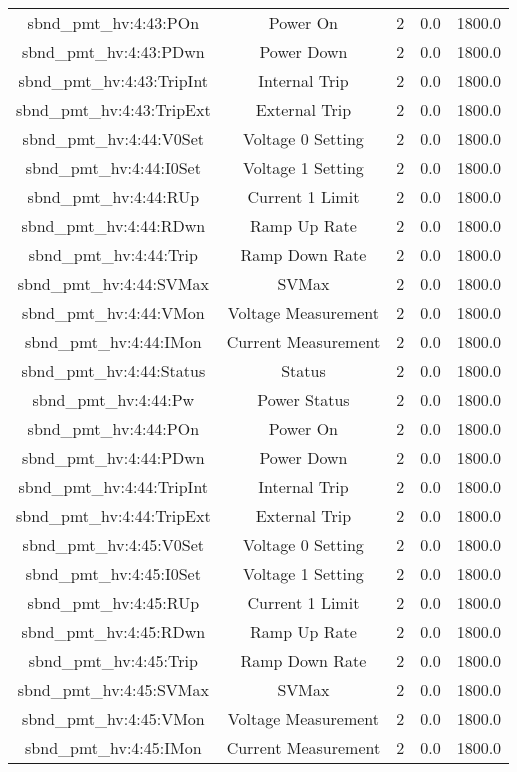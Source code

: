 \begin{center}
\begin{longtable}{c | c c c c }
sbnd\_pmt\_hv:4:43:POn & Power On & 2 & 0.0 & 1800.0\\ 
sbnd\_pmt\_hv:4:43:PDwn & Power Down & 2 & 0.0 & 1800.0\\ 
sbnd\_pmt\_hv:4:43:TripInt & Internal Trip & 2 & 0.0 & 1800.0\\ 
sbnd\_pmt\_hv:4:43:TripExt & External Trip & 2 & 0.0 & 1800.0\\ 
sbnd\_pmt\_hv:4:44:V0Set & Voltage 0 Setting & 2 & 0.0 & 1800.0\\ 
sbnd\_pmt\_hv:4:44:I0Set & Voltage 1 Setting & 2 & 0.0 & 1800.0\\ 
sbnd\_pmt\_hv:4:44:RUp & Current 1 Limit & 2 & 0.0 & 1800.0\\ 
sbnd\_pmt\_hv:4:44:RDwn & Ramp Up Rate & 2 & 0.0 & 1800.0\\ 
sbnd\_pmt\_hv:4:44:Trip & Ramp Down Rate & 2 & 0.0 & 1800.0\\ 
sbnd\_pmt\_hv:4:44:SVMax & SVMax & 2 & 0.0 & 1800.0\\ 
sbnd\_pmt\_hv:4:44:VMon & Voltage Measurement & 2 & 0.0 & 1800.0\\ 
sbnd\_pmt\_hv:4:44:IMon & Current Measurement & 2 & 0.0 & 1800.0\\ 
sbnd\_pmt\_hv:4:44:Status & Status & 2 & 0.0 & 1800.0\\ 
sbnd\_pmt\_hv:4:44:Pw & Power Status & 2 & 0.0 & 1800.0\\ 
sbnd\_pmt\_hv:4:44:POn & Power On & 2 & 0.0 & 1800.0\\ 
sbnd\_pmt\_hv:4:44:PDwn & Power Down & 2 & 0.0 & 1800.0\\ 
sbnd\_pmt\_hv:4:44:TripInt & Internal Trip & 2 & 0.0 & 1800.0\\ 
sbnd\_pmt\_hv:4:44:TripExt & External Trip & 2 & 0.0 & 1800.0\\ 
sbnd\_pmt\_hv:4:45:V0Set & Voltage 0 Setting & 2 & 0.0 & 1800.0\\ 
sbnd\_pmt\_hv:4:45:I0Set & Voltage 1 Setting & 2 & 0.0 & 1800.0\\ 
sbnd\_pmt\_hv:4:45:RUp & Current 1 Limit & 2 & 0.0 & 1800.0\\ 
sbnd\_pmt\_hv:4:45:RDwn & Ramp Up Rate & 2 & 0.0 & 1800.0\\ 
sbnd\_pmt\_hv:4:45:Trip & Ramp Down Rate & 2 & 0.0 & 1800.0\\ 
sbnd\_pmt\_hv:4:45:SVMax & SVMax & 2 & 0.0 & 1800.0\\ 
sbnd\_pmt\_hv:4:45:VMon & Voltage Measurement & 2 & 0.0 & 1800.0\\ 
sbnd\_pmt\_hv:4:45:IMon & Current Measurement & 2 & 0.0 & 1800.0\\ 

\end{longtable}
\end{center}
